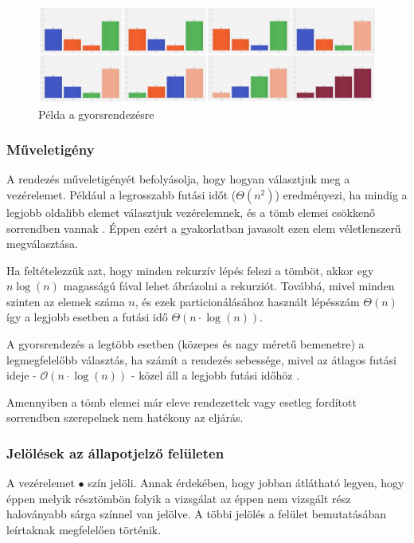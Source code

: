 \documentclass{elteikthesis}
\newcommand{\hiddensubsubsection}[1]{
	\stepcounter{subsubsection}
	\subsubsection*{{#1}}	
}
\begin{document}
 \begin{figure}[H]
 	\centering
 	\includegraphics[width=\textwidth]{pics/quick.jpg}
 	\caption{Példa a gyorsrendezésre}
 \end{figure}
\hiddensubsubsection{Műveletigény}
A rendezés műveletigényét befolyásolja, hogy hogyan választjuk meg a vezérelemet. Például a legrosszabb futási időt ($\Theta(n^2)$) eredményezi, ha mindig a legjobb oldalibb elemet választjuk vezérelemnek, és a tömb elemei csökkenő sorrendben vannak \cite{Cormen}. Éppen ezért a gyakorlatban javasolt ezen elem véletlenszerű megválasztása.\par
Ha feltételezzük azt, hogy minden rekurzív lépés felezi a tömböt, akkor egy $n\log(n)$ magasságú fával lehet ábrázolni a rekurziót. Továbbá, mivel minden szinten az elemek száma $n$, és ezek particionálásához használt lépésszám $\Theta(n)$ így a legjobb esetben a futási idő $\Theta(n\cdot\log(n))$.\par
 A gyorsrendezés a legtöbb esetben (közepes és nagy méretű bemenetre) a legmegfelelőbb választás, ha számít a rendezés sebessége, mivel az átlagos futási ideje - $\mathcal{O}(n\cdot\log(n))$ - közel áll a legjobb futási időhöz \cite{Cormen}.\par
 Amennyiben a tömb elemei már eleve rendezettek vagy esetleg fordított sorrendben szerepelnek nem hatékony az eljárás.
\hiddensubsubsection{Jelölések az állapotjelző felületen}
A vezérelemet \textcolor{select}{\Huge$\bullet$} szín jelöli. Annak érdekében, hogy jobban átlátható legyen, hogy éppen melyik résztömbön folyik a vizsgálat az éppen nem vizsgált rész haloványabb sárga színnel van jelölve. A többi jelölés a felület bemutatásában leírtaknak megfelelően történik.
\end{document}
